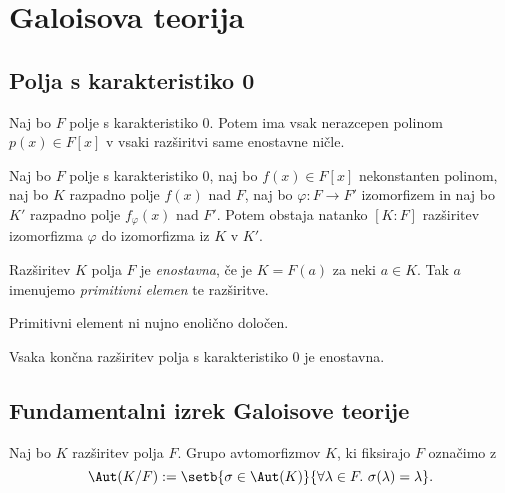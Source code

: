 \section{Galoisova teorija}
\subsection{Polja s karakteristiko 0}

\begin{izrek}
    Naj bo $F$ polje s karakteristiko $0$. Potem ima vsak 
    nerazcepen polinom $p(x) \in F[x]$ v vsaki razširitvi
    same enostavne ničle.
\end{izrek}

\begin{izrek}
    Naj bo $F$ polje s karakteristiko $0$, naj bo $f(x) \in F[x]$
    nekonstanten polinom, naj bo $K$ razpadno polje $f(x)$ nad $F$,
    naj bo $\varphi \colon F \to F'$ izomorfizem in naj bo 
    $K'$ razpadno polje $f_\varphi(x)$ nad $F'$. Potem 
    obstaja natanko $[K:F]$ razširitev izomorfizma 
    $\varphi$ do izomorfizma iz $K$ v $K'$.
\end{izrek}

\begin{definicija}
    Razširitev $K$ polja $F$ je \emph{enostavna},
    če je $K = F(a)$ za neki $a \in K$. Tak $a$ imenujemo 
    \emph{primitivni elemen} te razširitve.
\end{definicija}

\begin{opomba}
    Primitivni element ni nujno enolično določen.
\end{opomba}

\begin{izrek}
    Vsaka končna razširitev polja s karakteristiko $0$ 
    je enostavna.
\end{izrek}


\subsection{Fundamentalni izrek Galoisove teorije}


\begin{definicija}
    Naj bo $K$ razširitev polja $F$. Grupo avtomorfizmov $K$, ki fiksirajo $F$ označimo z 
    \[
        \Aut(K/F) := \setb{\sigma \in \Aut(K)}{\forall \lambda \in F.~\sigma(\lambda) = \lambda}.
    \]
\end{definicija}

